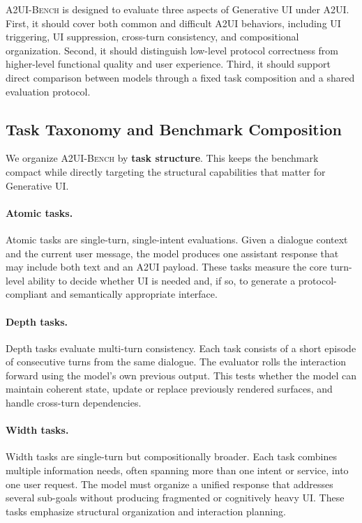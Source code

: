 \textsc{A2UI-Bench} is designed to evaluate three aspects of Generative UI under A2UI. First, it should cover both common and difficult A2UI behaviors, including UI triggering, UI suppression, cross-turn consistency, and compositional organization. Second, it should distinguish low-level protocol correctness from higher-level functional quality and user experience. Third, it should support direct comparison between models through a fixed task composition and a shared evaluation protocol.

\subsection{Task Taxonomy and Benchmark Composition}
\label{subsec:bench-taxonomy}

We organize \textsc{A2UI-Bench} by \textbf{task structure}. This keeps the benchmark compact while directly targeting the structural capabilities that matter for Generative UI.

\paragraph{Atomic tasks.}
Atomic tasks are single-turn, single-intent evaluations. Given a dialogue context and the current user message, the model produces one assistant response that may include both text and an A2UI payload. These tasks measure the core turn-level ability to decide whether UI is needed and, if so, to generate a protocol-compliant and semantically appropriate interface.

\paragraph{Depth tasks.}
Depth tasks evaluate multi-turn consistency. Each task consists of a short episode of consecutive turns from the same dialogue. The evaluator rolls the interaction forward using the model's own previous output. This tests whether the model can maintain coherent state, update or replace previously rendered surfaces, and handle cross-turn dependencies.

\paragraph{Width tasks.}
Width tasks are single-turn but compositionally broader. Each task combines multiple information needs, often spanning more than one intent or service, into one user request. The model must organize a unified response that addresses several sub-goals without producing fragmented or cognitively heavy UI. These tasks emphasize structural organization and interaction planning.

